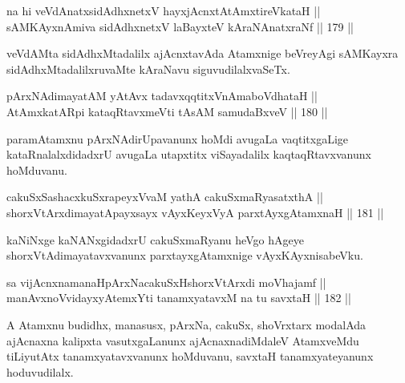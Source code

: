 \begin{shl}
na hi veVdAnatxsidAdhxnetxV hayxjAcnxtAtAmxtireVkataH || \\
sAMKAyxnAmiva sidAdhxnetxV laBayxteV kAraNAnatxraNf \hfill || 179 ||  
\end{shl}

\begin{artha}
veVdAMta sidAdhxMtadalilx ajAcnxtavAda Atamxnige beVreyAgi sAMKayxra
sidAdhxMtadalilxruvaMte kAraNavu siguvudilalxvaSeTx.
\end{artha}


\begin{shl}
pArxNAdimayatAM yAtAvx tadavxqqtitxVnAmaboVdhataH || \\
AtAmx\s katAR\s pi kataqRtavxmeVti tAsAM samudaBxveV \hfill || 180 ||  
\end{shl}

\begin{artha}
paramAtamxnu pArxNAdirUpavanunx hoMdi avugaLa vaqtitxgaLige
kataRnalalxdidadxrU avugaLa utapxtitx viSayadalilx kaqtaqRtavxvanunx
hoMduvanu.
\end{artha}


\begin{shl}
cakuSxSashacxkuSxrapeyxVvaM yathA cakuSxmaRyasatxthA || \\
shorxVtArxdimayatA\s payxsayx vAyxKeyxVyA parxtAyxgAtamxnaH \hfill || 181 ||  
\end{shl}

\begin{artha}
kaNiNxge kaNANxgidadxrU cakuSxmaRyanu heVgo hAgeye
shorxVtAdimayatavxvanunx parxtayxgAtamxnige vAyxKAyxnisabeVku.
\end{artha}

\begin{shl}
sa vijAcnxnamanaHpArxNacakuSxHshorxVtArxdi moVhajamf || \\
manAvxnoV\s vidayxyA\s \s temxYti tanamxyatavxM na tu savxtaH \hfill || 182 ||  
\end{shl}

\begin{artha}
A Atamxnu budidhx, manasusx, pArxNa, cakuSx, shoVrxtarx modalAda ajAcnaxna kalipxta vasutxgaLanunx ajAcnaxnadiMdaleV AtamxveMdu tiLiyutAtx tanamxyatavxvanunx hoMduvanu, savxtaH tanamxyateyanunx hoduvudilalx.
\end{artha}


